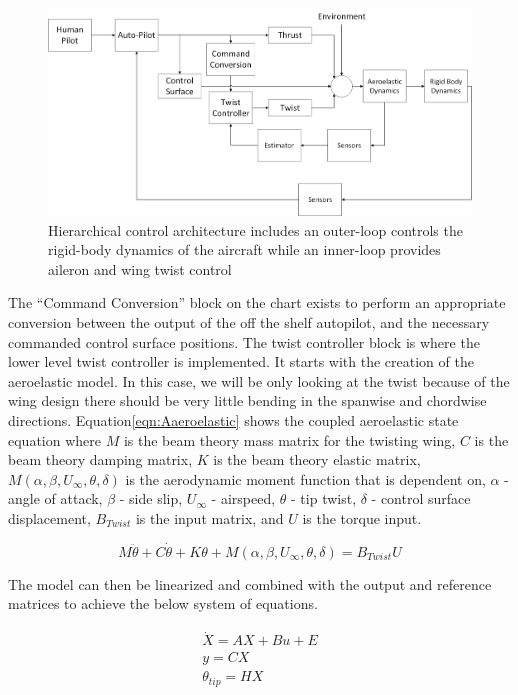 \documentclass[11pt]{ucthesis}
\begin{document}
\begin{figure}[thpb]
\centering
\includegraphics[width=.8\linewidth]{Figures/Phase1Control.png}
\caption{Hierarchical control architecture includes an outer-loop controls the rigid-body dynamics of the aircraft while an inner-loop provides aileron and wing twist control}
\label{fig:AControlBlockDiag}
\end{figure}

The ``Command Conversion'' block on the chart exists to perform an appropriate conversion between the output of the off the shelf autopilot, and the necessary commanded control surface positions. The twist controller block is where the lower level twist controller is implemented. It starts with the creation of the aeroelastic model. In this case, we will be only looking at the twist because of the wing design there should be very little bending in the spanwise and chordwise directions. Equation\ref{eqn:Aaeroelastic} shows the coupled aeroelastic state equation where $M$ is the beam theory mass matrix for the twisting wing, $C$ is the beam theory damping matrix, $K$ is the beam theory elastic matrix, $M(\alpha,\beta,U_{\infty},\theta,\delta)$ is the aerodynamic moment function that is dependent on, $\alpha$ - angle of attack, $\beta$ - side slip, $U_{\infty}$ - airspeed, $\theta$ - tip twist, $\delta$ - control surface displacement, $B_{Twist}$ is the input matrix, and $U$ is the torque input.

\begin{equation}
M \ddot{\theta} + C \dot{\theta} +K\theta+M(\alpha,\beta,U_{\infty},\theta,\delta) = B_{Twist}U
\label{eqn:Aaeroelastic}
\end{equation}

The model can then be linearized and combined with the output and reference matrices to achieve the below system of equations.

\begin{equation}
\begin{matrix}
\dot{X} = AX + Bu+E\\
y = CX\\
\theta_{tip} = HX
\end{matrix}
\label{eqn:Asys}
\end{equation}
\end{document}
